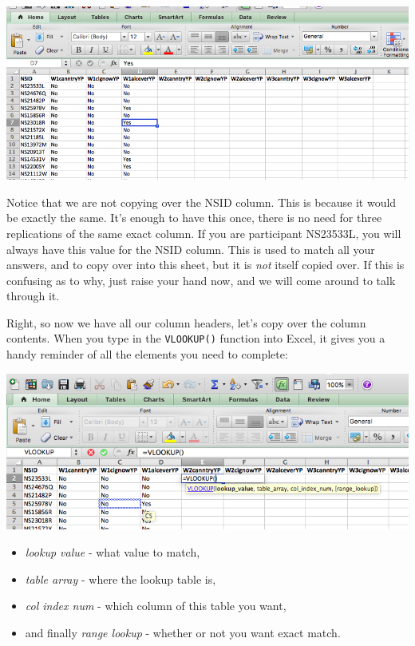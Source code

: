 \documentclass[
]{book}
\providecommand{\tightlist}{%
  \setlength{\itemsep}{0pt}\setlength{\parskip}{0pt}}
\begin{document}
\includegraphics{imgs/merge_copy_headers.png}

Notice that we are not copying over the NSID column. This is because it would be exactly the same. It's enough to have this once, there is no need for three replications of the same exact column. If you are participant NS23533L, you will always have this value for the NSID column. This is used to match all your answers, and to copy over into this sheet, but it is \emph{not} itself copied over. If this is confusing as to why, just raise your hand now, and we will come around to talk through it.

Right, so now we have all our column headers, let's copy over the column contents. When you type in the \texttt{VLOOKUP()} function into Excel, it gives you a handy reminder of all the elements you need to complete:

\includegraphics{imgs/vlookup_hints.png}

\begin{itemize}
\tightlist
\item
  \emph{lookup value} - what value to match,
\item
  \emph{table array} - where the lookup table is,
\item
  \emph{col index num} - which column of this table you want,
\item
  and finally \emph{range lookup} - whether or not you want exact match.
\end{itemize}
\end{document}
